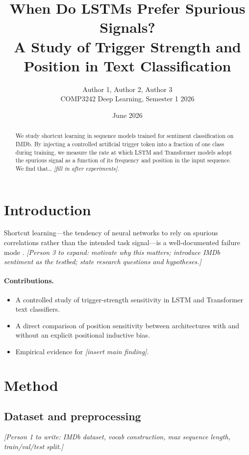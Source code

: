 \documentclass[10pt,a4paper]{article}
\title{When Do LSTMs Prefer Spurious Signals?\\
       A Study of Trigger Strength and Position in Text Classification}
\author{Author 1, Author 2, Author 3 \\
        COMP3242 Deep Learning, Semester 1 2026}
\date{June 2026}
\begin{document}
\maketitle

\begin{abstract}
We study shortcut learning in sequence models trained for sentiment
classification on IMDb. By injecting a controlled artificial trigger token
into a fraction of one class during training, we measure the rate at which
LSTM and Transformer models adopt the spurious signal as a function of its
frequency and position in the input sequence. We find that\ldots
\textit{[fill in after experiments].}
\end{abstract}

\section{Introduction}
\label{sec:intro}

Shortcut learning---the tendency of neural networks to rely on spurious
correlations rather than the intended task signal---is a well-documented
failure mode \citep{geirhos2020}. \textit{[Person 3 to expand: motivate why
this matters; introduce IMDb sentiment as the testbed; state research
questions and hypotheses.]}

\paragraph{Contributions.}
\begin{itemize}
  \item A controlled study of trigger-strength sensitivity in LSTM and
        Transformer text classifiers.
  \item A direct comparison of position sensitivity between architectures
        with and without an explicit positional inductive bias.
  \item Empirical evidence for \textit{[insert main finding]}.
\end{itemize}

\section{Method}
\label{sec:method}

\subsection{Dataset and preprocessing}
\textit{[Person 1 to write: IMDb dataset, vocab construction, max sequence
length, train/val/test split.]}
\end{document}
